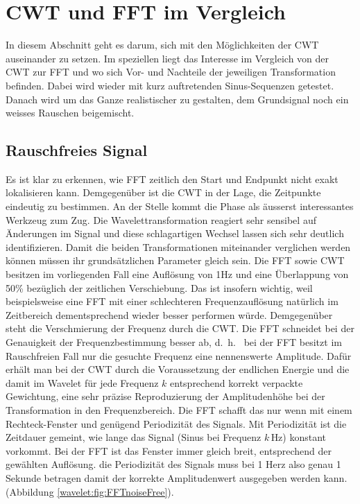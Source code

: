 %
%
%
%
\section{CWT und FFT im Vergleich
	\label{wavelets:section:teil4}}

In diesem Abschnitt geht es darum, sich mit den Möglichkeiten der CWT auseinander zu setzen. Im speziellen liegt das Interesse im Vergleich von der CWT zur FFT und wo sich Vor- und Nachteile der jeweiligen Transformation befinden. Dabei wird wieder mit kurz auftretenden Sinus-Sequenzen getestet.
Danach wird um das Ganze realistischer zu gestalten, dem Grundsignal noch ein weisses Rauschen beigemischt.

\subsection{Rauschfreies Signal
	\label{wavelets:subsection:CWTvsFFTRauschfrei}}
Es ist klar zu erkennen, wie FFT zeitlich den Start und Endpunkt nicht exakt lokalisieren kann. Demgegenüber ist die CWT in der Lage, die Zeitpunkte eindeutig zu bestimmen. An der Stelle kommt die Phase als äusserst interessantes Werkzeug zum Zug. Die Wavelettransformation reagiert sehr sensibel auf Änderungen im Signal und diese schlagartigen Wechsel lassen sich sehr deutlich identifizieren.
Damit die beiden Transformationen miteinander verglichen werden können müssen ihr grundsätzlichen Parameter gleich sein. Die FFT sowie CWT besitzen im vorliegenden Fall eine Auflösung von 1Hz und eine Überlappung von 50\% bezüglich der zeitlichen Verschiebung. Das ist insofern wichtig, weil beispielsweise eine FFT mit einer schlechteren Frequenzauflösung natürlich im Zeitbereich dementsprechend wieder besser performen würde.
Demgegenüber steht die Verschmierung der Frequenz durch die CWT. Die FFT schneidet bei der Genauigkeit der Frequenzbestimmung besser ab, d.~h.~ bei der FFT besitzt im Rauschfreien Fall nur die gesuchte Frequenz eine nennenswerte Amplitude. Dafür erhält man bei der CWT durch die Voraussetzung der endlichen Energie und die damit im Wavelet für jede Frequenz $k$ entsprechend korrekt verpackte Gewichtung, eine sehr präzise Reproduzierung der Amplitudenhöhe bei der Transformation in den Frequenzbereich. Die FFT schafft das nur wenn mit einem Rechteck-Fenster und genügend Periodizität des Signals. Mit Periodizität ist die Zeitdauer gemeint, wie lange das Signal (Sinus bei Frequenz $k\,$Hz) konstant vorkommt. Bei der FFT ist das Fenster immer gleich breit, entsprechend der gewählten Auflösung.
die Periodizität des Signals muss bei 1 Herz also genau 1 Sekunde betragen damit der korrekte Amplitudenwert ausgegeben werden kann.(Abbildung \ref{wavelet:fig:FFTnoiseFree}).

